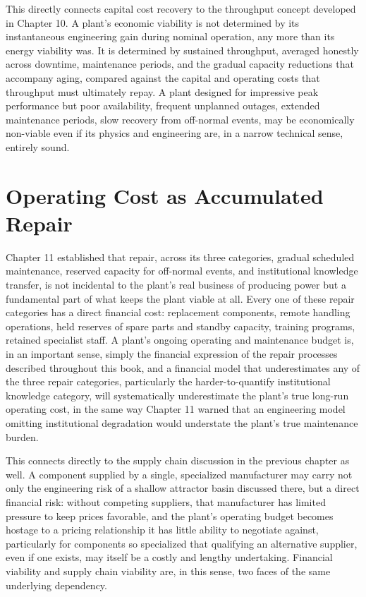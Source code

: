 This directly connects capital cost recovery to the throughput concept developed in Chapter 10. A plant's economic viability is not determined by its instantaneous engineering gain during nominal operation, any more than its energy viability was. It is determined by sustained throughput, averaged honestly across downtime, maintenance periods, and the gradual capacity reductions that accompany aging, compared against the capital and operating costs that throughput must ultimately repay. A plant designed for impressive peak performance but poor availability, frequent unplanned outages, extended maintenance periods, slow recovery from off-normal events, may be economically non-viable even if its physics and engineering are, in a narrow technical sense, entirely sound.

\section{Operating Cost as Accumulated Repair}

Chapter 11 established that repair, across its three categories, gradual scheduled maintenance, reserved capacity for off-normal events, and institutional knowledge transfer, is not incidental to the plant's real business of producing power but a fundamental part of what keeps the plant viable at all. Every one of these repair categories has a direct financial cost: replacement components, remote handling operations, held reserves of spare parts and standby capacity, training programs, retained specialist staff. A plant's ongoing operating and maintenance budget is, in an important sense, simply the financial expression of the repair processes described throughout this book, and a financial model that underestimates any of the three repair categories, particularly the harder-to-quantify institutional knowledge category, will systematically underestimate the plant's true long-run operating cost, in the same way Chapter 11 warned that an engineering model omitting institutional degradation would understate the plant's true maintenance burden.

This connects directly to the supply chain discussion in the previous chapter as well. A component supplied by a single, specialized manufacturer may carry not only the engineering risk of a shallow attractor basin discussed there, but a direct financial risk: without competing suppliers, that manufacturer has limited pressure to keep prices favorable, and the plant's operating budget becomes hostage to a pricing relationship it has little ability to negotiate against, particularly for components so specialized that qualifying an alternative supplier, even if one exists, may itself be a costly and lengthy undertaking. Financial viability and supply chain viability are, in this sense, two faces of the same underlying dependency.

